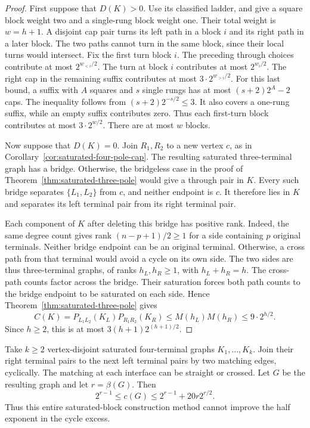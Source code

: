 \begin{proof}
First suppose that $D(K)>0$.
Use its classified ladder, and give a square block weight two and a single-rung block weight one.
Their total weight is $w=h+1$.
A disjoint cap pair turns its left path in a block $i$ and its right path in a later block.
The two paths cannot turn in the same block, since their local turns would intersect.
Fix the first turn block $i$.
The preceding through choices contribute at most $2^{w_{<i}/2}$.
The turn at block $i$ contributes at most $2^{w_i/2}$.
The right cap in the remaining suffix contributes at most $3\cdot2^{w_{>i}/2}$.
For this last bound, a suffix with $A$ squares and $s$ single rungs has at most $(s+2)2^A-2$ caps.
The inequality follows from $(s+2)2^{-s/2}\le3$.
It also covers a one-rung suffix, while an empty suffix contributes zero.
Thus each first-turn block contributes at most $3\cdot2^{w/2}$.
There are at most $w$ blocks.

Now suppose that $D(K)=0$.
Join $R_1,R_2$ to a new vertex $c$, as in Corollary~\ref{cor:saturated-four-pole-cap}.
The resulting saturated three-terminal graph has a bridge.
Otherwise, the bridgeless case in the proof of Theorem~\ref{thm:saturated-three-pole} would give a through pair in $K$.
Every such bridge separates $\{L_1,L_2\}$ from $c$, and neither endpoint is $c$.
It therefore lies in $K$ and separates its left terminal pair from its right terminal pair.

Each component of $K$ after deleting this bridge has positive rank.
Indeed, the same degree count gives rank $(n-p+1)/2\ge1$ for a side containing $p$ original terminals.
Neither bridge endpoint can be an original terminal.
Otherwise, a cross path from that terminal would avoid a cycle on its own side.
The two sides are thus three-terminal graphs, of ranks $h_L,h_R\ge1$, with $h_L+h_R=h$.
The cross-path counts factor across the bridge.
Their saturation forces both path counts to the bridge endpoint to be saturated on each side.
Hence Theorem~\ref{thm:saturated-three-pole} gives
\[
 C(K)=P_{L_1L_2}(K_L)P_{R_1R_2}(K_R)
 \le M(h_L)M(h_R)\le9\cdot2^{h/2}.
\]
Since $h\ge2$, this is at most $3(h+1)2^{(h+1)/2}$.
\end{proof}

\begin{theorem}\label{thm:saturated-ring-barrier}
Take $k\ge2$ vertex-disjoint saturated four-terminal graphs $K_1,\ldots,K_k$.
Join their right terminal pairs to the next left terminal pairs by two matching edges, cyclically.
The matching at each interface can be straight or crossed.
Let $G$ be the resulting graph and let $r=\beta(G)$.
Then
\[
 2^{r-1}\le c(G)\le2^{r-1}+20r2^{r/2}.
\]
Thus this entire saturated-block construction method cannot improve the half exponent in the cycle excess.
\end{theorem}

